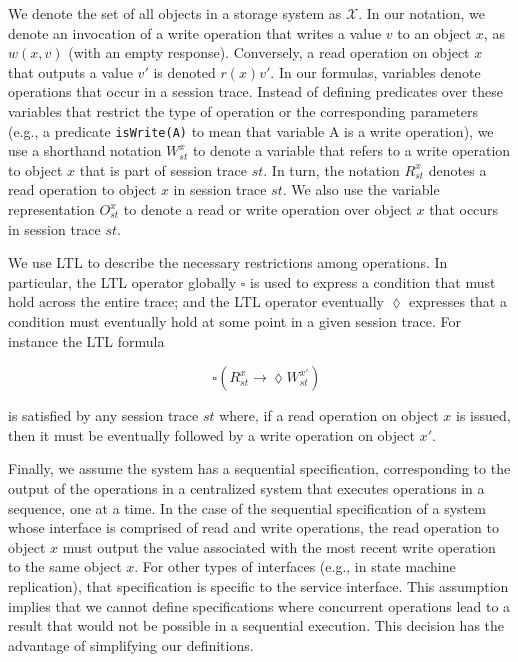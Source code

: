 \documentclass[journal, compsoc]{IEEEtran}
\begin{document}
	We denote the set of all objects in a storage system as $\mathcal{X}$. In our notation, we denote an invocation of a write operation that writes a value $v$ to an object $x$, as $w(x,v)$ (with an empty response). Conversely, a read operation on object $x$ that outputs a value $v'$ is denoted $r(x){v'}$.
	In our formulas, variables denote operations that occur in a session trace.
	Instead of defining predicates over these variables that restrict the type of operation or the corresponding parameters (e.g., a predicate {\tt isWrite(A)} to mean that variable A is a write operation), we use a shorthand notation $W^{x}_{st}$ to denote a variable that refers to a write operation to object $x$ that is part of session trace $st$. In turn, the notation $R^{x}_{st}$ denotes a read operation to object $x$ in session trace $st$. We also use the variable representation $O^{x}_{st}$ to denote a read or write operation over object $x$ that occurs in session trace $st$.
	
	We use LTL to describe the necessary restrictions among operations. In particular, the LTL operator globally $\square$ is used to express a condition that must hold across the entire trace; and the LTL operator eventually $\lozenge$ expresses that a condition must eventually hold at some point in a given session trace.  For instance the LTL formula
	
	$$ \quad \square \left( R_\mathit{st}^x \rightarrow \lozenge W_\mathit{st}^{x'} \right) $$
	
	\noindent is satisfied by any session trace $st$ where, if a read operation on object $x$ is issued, then it must be eventually followed by a write operation on object $x'$.
	
	Finally, we assume the system has a sequential specification, %
	corresponding to the output of the operations in a centralized system that executes operations in a sequence, one at a time. In the case of the sequential specification of a system whose interface is comprised of read and write operations, the read operation to object $x$ must output the value associated with the most recent write operation to the same object $x$. For other types of interfaces (e.g., in state machine replication), that specification %
	is specific to the service interface. %
	This assumption implies that we cannot define specifications where concurrent operations lead to a result that would not be possible in a sequential execution. This decision has the advantage of simplifying our definitions.
	
\end{document}
